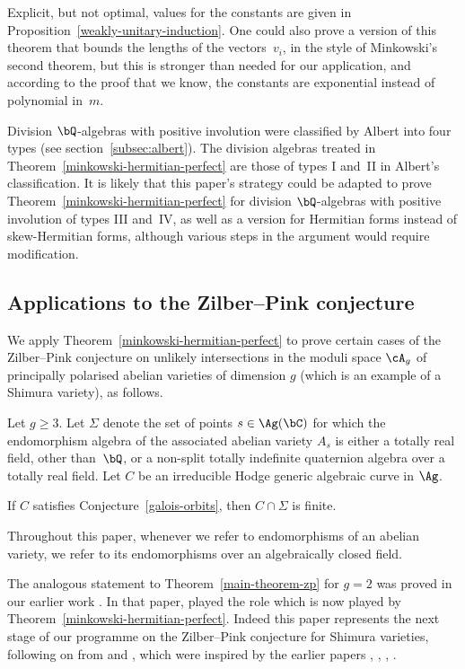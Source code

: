 Explicit, but not optimal, values for the constants are given in Proposition~\ref{weakly-unitary-induction}.
One could also prove a version of this theorem that bounds the lengths of the vectors~$v_i$, in the style of Minkowski's second theorem, but this is stronger than needed for our application, and according to the proof that we know, the constants are exponential instead of polynomial in~$m$.

Division $\bQ$-algebras with positive involution were classified by Albert into four types (see section~\ref{subsec:albert}).
The division algebras treated in Theorem~\ref{minkowski-hermitian-perfect} are those of types I and~II in Albert's classification.
It is likely that this paper's strategy could be adapted to prove Theorem~\ref{minkowski-hermitian-perfect} for division $\bQ$-algebras with positive involution of types III and~IV, as well as a version for Hermitian forms instead of skew-Hermitian forms, although various steps in the argument would require modification.

\subsection{Applications to the Zilber--Pink conjecture} \label{subsec:intro-zp-theorem}

We apply Theorem~\ref{minkowski-hermitian-perfect} to prove certain cases of the Zilber--Pink conjecture on unlikely intersections in the moduli space $\cA_g$ of principally polarised abelian varieties of dimension $g$ (which is an example of a Shimura variety), as follows.

\begin{theorem} \label{main-theorem-zp}
Let $g \geq 3$.
Let $\Sigma$ denote the set of points $s \in \Ag(\bC)$ for which the endomorphism algebra of the associated abelian variety $A_s$ is either a totally real field, other than~$\bQ$, or a non-split totally indefinite quaternion algebra over a totally real field.
Let $C$ be an irreducible Hodge generic algebraic curve in $\Ag$.

If $C$ satisfies Conjecture~\ref{galois-orbits}, then $C \cap \Sigma$ is finite.
\end{theorem}

Throughout this paper, whenever we refer to endomorphisms of an abelian variety, we refer to its endomorphisms over an algebraically closed field.

The analogous statement to Theorem~\ref{main-theorem-zp} for $g=2$ was proved in our earlier work \cite{QRTUI}.
In that paper, \cite[Lem.\,5.7]{QRTUI} played the role which is now played by Theorem~\ref{minkowski-hermitian-perfect}.
Indeed this paper represents the next stage of our programme on the Zilber--Pink conjecture for Shimura varieties, following on from \cite{ExCM} and \cite{QRTUI}, which were inspired by the earlier papers \cite{HP12}, \cite{HP16}, \cite{DR18}, \cite{OrrUI}.

